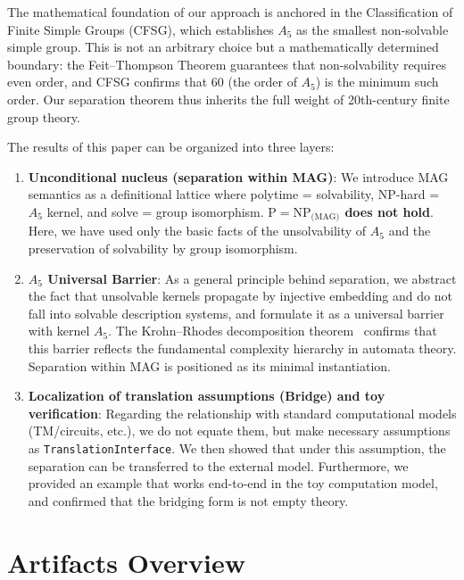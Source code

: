 \documentclass[11pt,a4paper]{article}
\theoremstyle{plain}
\theoremstyle{definition}
\newcommand{\Aalt}{A_5}
\newcommand{\TranslationInterface}{\texttt{TranslationInterface}}
\begin{document}
The mathematical foundation of our approach is anchored in the Classification of 
Finite Simple Groups (CFSG), which establishes $A_5$ as the smallest non-solvable 
simple group. This is not an arbitrary choice but a mathematically determined 
boundary: the Feit--Thompson Theorem guarantees that non-solvability requires 
even order, and CFSG confirms that 60 (the order of $A_5$) is the minimum such 
order. Our separation theorem thus inherits the full weight of 20th-century 
finite group theory.

The results of this paper can be organized into three layers:
\begin{enumerate}[nosep]
\item \textbf{Unconditional nucleus (separation within MAG)}: We introduce MAG semantics as a definitional lattice where polytime = solvability, NP-hard = $\Aalt$ kernel, and solve = group isomorphism. \textbf{$\mathrm{P}=\mathrm{NP}_{\text{(MAG)}}$ does not hold}. Here, we have used only the basic facts of the unsolvability of $\Aalt$ and the preservation of solvability by group isomorphism.
\item \textbf{$\Aalt$ Universal Barrier}: As a general principle behind separation, we abstract the fact that unsolvable kernels propagate by injective embedding and do not fall into solvable description systems, and formulate it as a universal barrier with kernel $\Aalt$. The Krohn--Rhodes decomposition theorem~\cite{krohnrhodes1965} confirms that this barrier reflects the fundamental complexity hierarchy in automata theory. Separation within MAG is positioned as its minimal instantiation.
\item \textbf{Localization of translation assumptions (Bridge) and toy verification}: Regarding the relationship with standard computational models (TM/circuits, etc.), we do not equate them, but make necessary assumptions as \TranslationInterface{}. We then showed that under this assumption, the separation can be transferred to the external model. Furthermore, we provided an example that works end-to-end in the toy computation model, and confirmed that the bridging form is not empty theory.
\end{enumerate}

\section*{Artifacts Overview}
\end{document}
